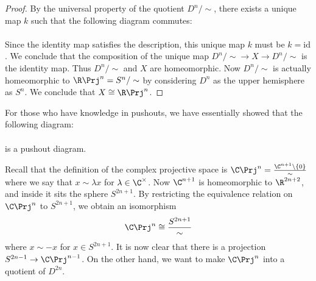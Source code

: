 \documentclass[a4paper]{article}
\begin{document}
\begin{prp}{}{}
\begin{proof}
By the universal property of the quotient $D^n/\sim$, there exists a unique map $k$ such that the following diagram commutes: \\
\\
Since the identity map satisfies the description, this unique map $k$ must be $k=\text{id}$. We conclude that the composition of the unique map $D^n/\sim\to X\to D^n/\sim$ is the identity map. Thus $D^n/\sim$ and $X$ are homeomorphic. Now $D^n/\sim$ is actually homeomorphic to $\R\Prj^n=S^n/\sim$ by considering $D^n$ as the upper hemisphere as $S^n$. We conclude that $X\cong\R\Prj^n$. 
\end{proof}
\end{prp}

For those who have knowledge in pushouts, we have essentially showed that the following diagram: \\
\\
is a pushout diagram. 

Recall that the definition of the complex projective space is $\C\Prj^n=\frac{\C^{n+1}\setminus\{0\}}{\sim}$ where we say that $x\sim\lambda x$ for $\lambda\in\C^\times$. Now $\C^{n+1}$ is homeomorphic to $\R^{2n+2}$, and inside it sits the sphere $S^{2n+1}$. By restricting the equivalence relation on $\C\Prj^n$ to $S^{2n+1}$, we obtain an isomorphism $$\C\Prj^n\cong\frac{S^{2n+1}}{\sim}$$ where $x\sim -x$ for $x\in S^{2n+1}$. It is now clear that there is a projection $S^{2n-1}\to\C\Prj^{n-1}$. On the other hand, we want to make $\C\Prj^n$ into a quotient of $D^{2n}$. 
\end{document}
